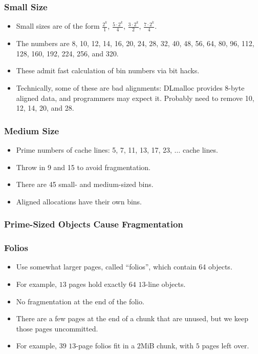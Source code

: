 \documentclass[xcolor=dvipsnames,14pt]{beamer}
\newcommand{\smmpunt}[1]{#1}
\begin{document}
\smmpunt{
\begin{frame}
\frametitle{Small Size}

\begin{itemize}
\item Small sizes are of the form $\frac{2^k}{1}$, $\frac{5 \cdot 2^k}{4}$, $\frac{3 \cdot 2^k}{2}$, $\frac{7 \cdot 2^k}{4}$.  
\item The numbers are 8, 10, 12, 14, 16, 20, 24, 28, 32, 40, 48, 56, 64, 80, 96, 112, 128, 160, 192, 224, 256, and 320.
\item These admit fast calculation of bin numbers via bit hacks.
\item Technically, some of these are bad alignments:  DLmalloc provides 8-byte aligned data, and programmers may expect it.  Probably need to remove 10, 12, 14, 20, and 28.
\end{itemize}
\end{frame}
}

\smmpunt{
\begin{frame}
\frametitle{Medium Size}
\begin{itemize}
\item Prime numbers of cache lines: 5, 7, 11, 13, 17, 23,
  $\ldots$ cache lines.

\item Throw in 9 and 15 to avoid fragmentation.

\item There are 45 small- and medium-sized bins.
\item Aligned allocations have their own bins.
\end{itemize}
\end{frame}
}

\begin{frame}
\frametitle{Prime-Sized Objects Cause Fragmentation}
\hspace*{-0.5cm}
\end{frame}

\begin{frame}
\frametitle{Folios}
\begin{itemize}
\item Use somewhat larger pages, called ``folios'', which contain 64 objects.
\item For example, $13$ pages hold exactly $64$ $13$-line objects.
\item No fragmentation at the end of the folio.
\item There are a few pages at the end of a chunk that are unused, but we keep those pages uncommitted.
\item For example, $39$ $13$-page folios fit in a $2$MiB chunk, with $5$ pages left over.
\end{itemize}

\end{frame}
\end{document}
